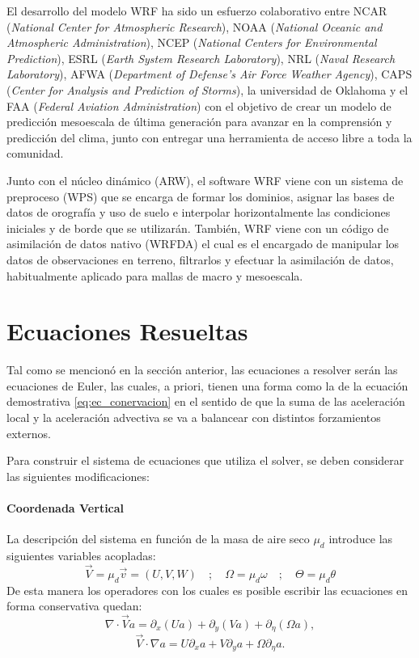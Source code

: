 El desarrollo del modelo WRF ha sido un esfuerzo colaborativo entre NCAR (\emph{National Center for Atmospheric Research}), NOAA (\emph{National Oceanic and Atmospheric Administration}), NCEP (\emph{National Centers for Environmental Prediction}), ESRL (\emph{Earth System Research Laboratory}), NRL (\emph{Naval Research Laboratory}), AFWA (\emph{Department of Defense's Air Force Weather Agency}), CAPS (\emph{Center for Analysis and Prediction of Storms}), la universidad de Oklahoma y el FAA (\emph{Federal Aviation Administration}) con el objetivo de crear un modelo de predicción mesoescala de última generación para avanzar en la comprensión y predicción del clima, junto con entregar una herramienta de acceso libre a toda la comunidad.

Junto con el núcleo dinámico (ARW), el software WRF viene con un sistema de preproceso (WPS) que se encarga de formar los dominios, asignar las bases de datos de orografía y uso de suelo e interpolar horizontalmente las condiciones iniciales y de borde que se utilizarán. También, WRF viene con un código de asimilación de datos nativo (WRFDA) el cual es el encargado de manipular los datos de observaciones en terreno, filtrarlos y efectuar la asimilación de datos, habitualmente aplicado para mallas de macro y mesoescala.
 
\newpage
\section{Ecuaciones Resueltas}
Tal como se mencionó en la sección anterior, las ecuaciones a resolver serán las ecuaciones de Euler, las cuales, a priori, tienen una forma como la de la ecuación demostrativa \ref{eq:ec_conervacion} en el sentido de que la suma de las aceleración local y la aceleración advectiva se va a balancear con distintos forzamientos externos.

Para construir el sistema de ecuaciones que utiliza el solver, se deben considerar las siguientes modificaciones:
\paragraph{Coordenada Vertical} La descripción del sistema en función de la masa de aire seco $\mu_d$ introduce las siguientes variables acopladas:
\begin{equation}
\vec{V}=\mu_d\vec{v}=(U,V,W)\quad;\quad \Omega = \mu_d \omega \quad;\quad \Theta = \mu_d \theta
\end{equation}
De esta manera los operadores con los cuales es posible escribir las ecuaciones en forma conservativa quedan:
\begin{equation}
\nabla\cdot\vec{V}a = \partial_x(Ua)+\partial_y(Va)+\partial_\eta (\Omega a),
\end{equation}
\begin{equation}
\vec{V}\cdot \nabla a = U\partial_x a + V\partial_y a + \Omega\partial_\eta a.
\end{equation}
